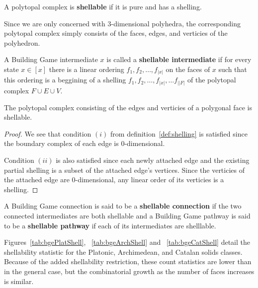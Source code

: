 \begin{mydef}
A polytopal complex is \textbf{shellable} if it is pure and has a shelling. 
\end{mydef}

Since we are only concerned with $3$-dimensional polyhedra, the corresponding polytopal complex simply consists of the faces, edges, and verticies of the polyhedron. 



\begin{mydef}
A Building Game intermediate $x$ is called a \textbf{shellable intermediate} if for every state $x \in [x]$ there is a linear ordering $f_1, f_2, \dots, f_{|x|}$ on the faces of $x$ such that this ordering is a beggining of a shelling $f_1, f_2, \dots, f_{|x|}, \dots f_{||F|}$ of the polytopal complex $F\cup E\cup V$.
\end{mydef}

\begin{mylem}
The polytopal complex consisting of the edges and verticies of a polygonal face is shellable.
\end{mylem}
\begin{proof}
We see that condition $(i)$ from definition~\ref{def:shelling} is satisfied since the boundary complex of each edge is $0$-dimensional.

Condition $(ii)$ is also satisfied since each newly attached edge and the existing partial shelling is a subset of the attached edge's vertices. Since the verticies of the attached edge are $0$-dimensional, any linear order of its verticies is a shelling.
\end{proof}



\begin{mydef}
A Building Game connection is said to be a \textbf{shellable connection} if the two connected intermediates are both shellable and a Building Game pathway is said to be a \textbf{shellable pathway} if each of its intermediates are shelllable.
\end{mydef}

Figures~\ref{tab:bgePlatShell}, ~\ref{tab:bgeArchShell} and ~\ref{tab:bgeCatShell} detail the shellability statistic for the Platonic, Archimedean, and Catalan solids classes. Because of the added shellability restriction, these count statistics are lower than in the general case, but the combinatorial growth as the number of faces increases is similar.  


